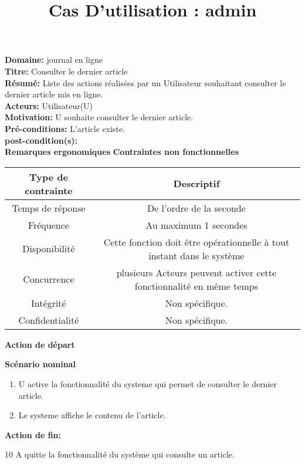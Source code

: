 \documentclass[a4paper,10pt]{article}
\title{Cas D'utilisation : admin}
\author{}
\begin{document}
\maketitle



\textbf{Domaine:} journal en ligne\\
\textbf{Titre:} Consulter le dernier article\\
\textbf{Résumé:} Liste des actions réalisées par un Utilisateur souhaitant consulter le dernier article
mis en ligne.\\
\textbf{Acteurs:} Utilisateur(U)\\
\textbf{Motivation:} U souhaite consulter le dernier article.\\
\textbf{Pré-conditions:} L'article existe.\\
\textbf{post-condition(s):}\\

\textbf{Remarques ergonomiques}
\textbf{Contraintes non fonctionnelles}
\begin{center}
  \begin{tabular}{|c|c|}
\hline
   \textbf{Type de contrainte}&\textbf{Descriptif}\\
\hline
Temps de réponse&De l'ordre de la seconde\\
\hline
Fréquence & Au maximum 1 secondes\\
\hline
Disponibilité & Cette fonction doit être opérationnelle à tout instant dans le système\\
\hline
Concurrence&plusieurs Acteurs peuvent activer cette fonctionnalité en même temps\\
\hline
Intégrité&Non spécifique.\\
\hline
Confidentialité& Non spécifique.\\
\hline

  \end{tabular}
\end{center}

\textbf{Action de départ}

\textbf{Scénario nominal}
\begin{enumerate}
\item U active la fonctionnalité du systeme qui permet de consulter le dernier article.
\item Le systeme affiche le contenu de l'article.
\end{enumerate}

\textbf{Action de fin:}

10 A quitte la fonctionnalité du système qui consulte un article.
\end{document}
